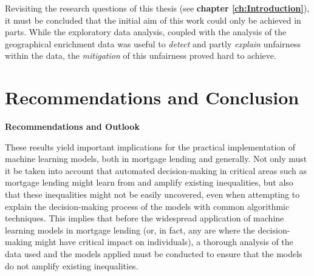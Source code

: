 Revisiting the research questions of this thesis (see \textbf{chapter \ref{ch:Introduction}}), it must be concluded that the initial aim of this work could only be achieved in parts. 
While the exploratory data analysis, coupled with the analysis of the geographical enrichment data was useful to \textit{detect} and partly \textit{explain} unfairness within the data, the \textit{mitigation} of this unfairness proved hard to achieve. 

\section{Recommendations and Conclusion}\label{sec:conclusion}

\textbf{Recommendations and Outlook}

These results yield important implications for the practical implementation of machine learning models, both in mortgage lending and generally. Not only must it be taken into account that automated decision-making in critical areas such as mortgage lending might learn from and amplify existing inequalities, but also that these inequalities might not be easily uncovered, even when attempting to explain the decision-making process of the models with common algorithmic techniques.
This implies that before the widespread application of machine learning models in mortgage lending (or, in fact, any are where the decision-making might have critical impact on individuals), a thorough analysis of the data used and the models applied must be conducted to ensure that the models do not amplify existing inequalities.

